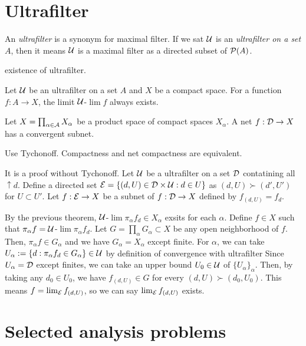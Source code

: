 \documentclass[a4paper]{article}
\begin{document}
\section{Ultrafilter}
\begin{defn}
An \emph{ultrafilter} is a synonym for maximal filter.
If we sat $\mathcal{U}$ is an \emph{ultrafilter on a set} $A$, then it means $\mathcal{U}$ is a maximal filter as a directed subset of $\mathcal{P}(A)$.
\end{defn}
existence of ultrafilter.
\begin{thm}
Let $\mathcal{U}$ be an ultrafilter on a set $A$ and $X$ be a compact space.
For a function $f:A\to X$, the limit $\mathcal{U}$-$\lim f$ always exists.
\end{thm}

\begin{thm}
Let $X=\prod_{\alpha\in\mathcal{A}}X_\alpha$ be a product space of compact spaces $X_\alpha$.
A net $f:\mathcal{D}\to X$ has a convergent subnet.
\end{thm}
\begin{pf}[1]
Use Tychonoff.
Compactness and net compactness are equivalent.
\end{pf}
\begin{pf}[2]
It is a proof without Tychonoff.
Let $\mathcal{U}$ be a ultrafilter on a set $\mathcal{D}$ contatining all $\uparrow d$.
Define a directed set $\mathcal{E}=\{(d,U)\in\mathcal{D}\times\mathcal{U}:d\in U\}$ as $(d,U)\succ(d',U')$ for $U\subset U'$.
Let $f:\mathcal{E}\to X$ be a subnet of $f:\mathcal{D}\to X$ defined by $f_{(d,U)}=f_d$.

By the previous theorem, $\mathcal{U}$-$\lim\pi_\alpha f_d\in X_\alpha$ exsits for each $\alpha$.
Define $f\in X$ such that $\pi_\alpha f=\mathcal{U}$-$\lim\pi_\alpha f_d$.
Let $G=\prod_\alpha G_\alpha\subset X$ be any open neighborhood of $f$.
Then, $\pi_\alpha f\in G_\alpha$ and we have $G_\alpha=X_\alpha$ except finite.
For $\alpha$, we can take $U_\alpha:=\{d:\pi_\alpha f_d\in G_\alpha\}\in\mathcal{U}$ by definition of convergence with ultrafilter
Since $U_\alpha=\mathcal{D}$ except finites, we can take an upper bound $U_0\in\mathcal{U}$ of $\{U_\alpha\}_\alpha$.
Then, by taking any $d_0\in U_0$, we have $f_{(d,U)}\in G$ for every $(d,U)\succ(d_0,U_0)$.
This means $f=\lim_{\mathcal{E}} f_{(d,U)}$, so we can say $\lim_{\mathcal{E}} f_{(d,U)}$ exists.
\end{pf}







\section{Selected analysis problems}
\end{document}

